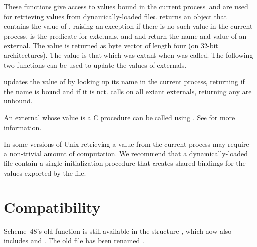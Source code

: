 \begin{protos}
\end{protos}
\noindent
These functions give access to values bound in the current process, and
 are used for retrieving values from dynamically-loaded files.
 returns an  object that contains the
 value of , raising an exception if there is no such
 value in the current process.
 is the predicate for externals, and
 and  return the name and
 value of an external.
The value is returned as byte vector of length four (on 32-bit
 architectures).
The value is that which was extant when  was
 called.
The following two functions can be used to update the values of
 externals.

\begin{protos}
\end{protos}
\noindent
{} updates the value of  by looking up its
 name in the current process, returning  if the name is bound
 and  if it is not.
 calls  on all extant
 externals, returning  any are unbound.

\begin{protos}
\end{protos}
\noindent
An external whose value is a C procedure can be called using
 .
See
for more information.

In some versions of Unix retrieving a value from the current
 process may require a non-trivial amount of computation.
We recommend that a dynamically-loaded file contain a single initialization
 procedure that creates shared bindings for the values exported by the file.

\section{Compatibility}

Scheme~48's old  function is still available in the
 structure
 , which now also includes  and
 .
The old  file has been renamed .

